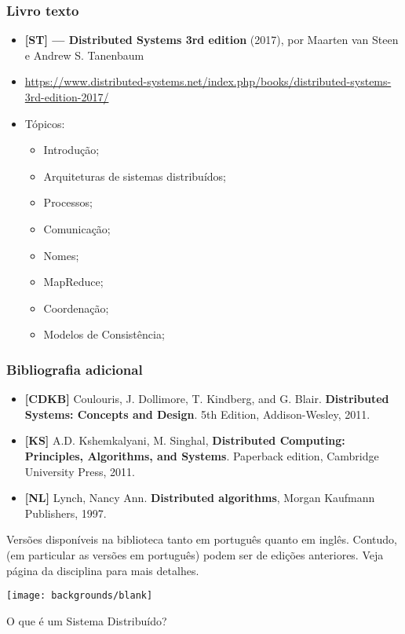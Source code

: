 \documentclass[Ligatures=TeX,table,brazil,svgnames,usetotalslideindicator,comp
ress,10pt]{beamer}
\newcommand{\setintersectionbg}{
    \setbeamertemplate{background}
     {\texttt{[image: backgrounds/blank]}}
}
\begin{document}
\begin{frame}
  \frametitle{Livro texto}
  \begin{itemize}
  \item \textbf{[ST] --- Distributed Systems 3rd edition} (2017), por Maarten van Steen e Andrew S. Tanenbaum
  \item \url{https://www.distributed-systems.net/index.php/books/distributed-systems-3rd-edition-2017/}
  \item Tópicos:
    \begin{itemize}
    \item Introdução;
    \item Arquiteturas de sistemas distribuídos;
    \item Processos;
    \item Comunicação;
    \item Nomes;
    \item MapReduce;
    \item Coordenação;
    \item Modelos de Consistência;
    \end{itemize}
  \end{itemize}

\end{frame}

\begin{frame}
  \frametitle{Bibliografia adicional}
  \begin{itemize}
  \item  \textbf{[CDKB]} Coulouris, J. Dollimore, T. Kindberg, and
    G. Blair. \textbf{Distributed Systems: Concepts and Design}. 5th Edition,
    Addison-Wesley, 2011.
  \item \textbf{[KS]} A.D. Kshemkalyani, M. Singhal, \textbf{Distributed Computing:
      Principles, Algorithms, and Systems}. Paperback edition, Cambridge
    University Press, 2011.
  \item \textbf{[NL]} Lynch, Nancy Ann. \textbf{Distributed algorithms}, Morgan Kaufmann
    Publishers, 1997.
  \end{itemize}

  Versões disponíveis na biblioteca tanto em português quanto em
  inglês. Contudo, (em particular as versões em português) podem ser
  de edições anteriores. Veja página da disciplina para mais detalhes.
\end{frame}


\setintersectionbg
\begin{frame}[standout]
  O que é um Sistema Distribuído?
\end{frame}
\end{document}

